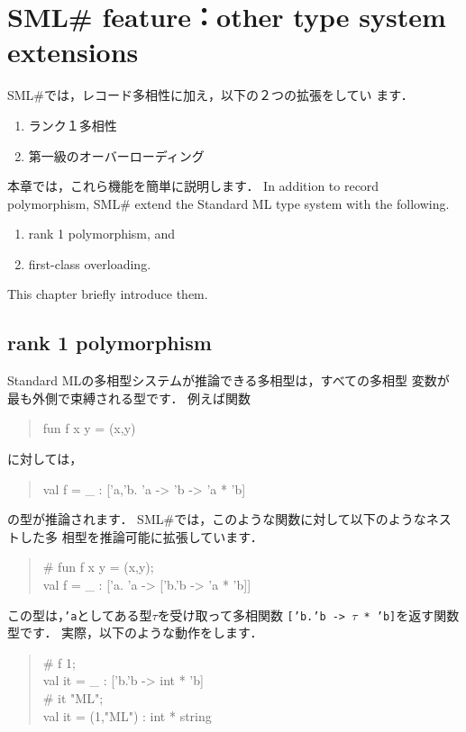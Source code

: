 \documentclass{jbook}
\newcommand{\txt}[2]{#2}
\newcommand{\smlsharp}{SML\#}
\newenvironment{program}{\begin{tt}\begin{quote}}{\end{quote}\end{tt}}
\begin{document}
\chapter{
\txt{\smlsharp{}の拡張機能：その他の型の拡張}
    {\smlsharp{} feature：other type system extensions}}
\label{chap:tutorialOthertyping}

\ifx\jp%
	\smlsharp{}では，レコード多相性に加え，以下の２つの拡張をしてい
ます．
\begin{enumerate}
\item ランク１多相性
\item 第一級のオーバーローディング
\end{enumerate}
	本章では，これら機能を簡単に説明します．
\else%
	In addition to record polymorphism, \smlsharp{} extend the Standard
ML type system  with the following.
\begin{enumerate}
\item rank 1 polymorphism, and
\item first-class overloading.
\end{enumerate}
	This chapter briefly introduce them.
\fi%

\section{\txt{ランク１多相性}{rank 1 polymorphism}}
\label{sec:extensionRank1}

\ifx\jp%
	Standard MLの多相型システムが推論できる多相型は，すべての多相型
変数が最も外側で束縛される型です．
	例えば関数
\begin{program}
fun f x y = (x,y)
\end{program}
に対しては，
\begin{program}
val f = \_ : ['a,'b. 'a -> 'b -> 'a * 'b]
\end{program}
の型が推論されます．
	\smlsharp{}では，このような関数に対して以下のようなネストした多
相型を推論可能に拡張しています．
\begin{program}
\# fun f x y = (x,y);\\
val f = \_ : ['a. 'a -> ['b.'b -> 'a * 'b]]
\end{program}
	この型は，{\tt 'a}としてある型$\tau$を受け取って多相関数
{\tt ['b.'b -> $\tau$ * 'b]}を返す関数型です．
	実際，以下のような動作をします．
\begin{program}
\# f 1;\\
val it = \_ : ['b.'b -> int * 'b]\\
\# it "ML";\\
val it = (1,"ML") : int * string
\end{program}
\end{document}
